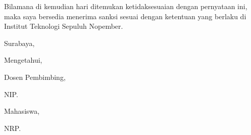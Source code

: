     \vspace{5mm}
    \noindent
    Bilamana di kemudian hari ditemukan ketidaksesuaian dengan pernyataan ini, maka saya bersedia menerima sanksi sesuai dengan ketentuan yang berlaku di Institut Teknologi Sepuluh Nopember.

    \vspace{1cm}
    \begin{flushright}
        Surabaya, ~\@tanggal ~\@bulan ~\@tahun
    \end{flushright}

    \noindent Mengetahui,

    \vspace{1mm}
\begin{center}
    \begin{minipage}{.4\textwidth}
        \centering
        Dosen Pembimbing,

        \vspace{3cm}

        \underline{\pbb@satu}

        NIP. \NIP@pbb@satu
    \end{minipage}
    \hfill
    \begin{minipage}{.4\textwidth}
        \centering
        Mahasiswa,

        \vspace{3cm}

        \underline{\@nama}

        NRP. \@NRP
    \end{minipage}
\end{center}

\makeatother